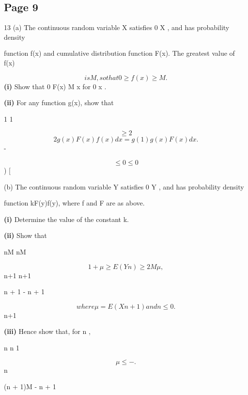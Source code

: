 \documentclass[12pt]{article}
\begin{document}
\subsection*{Page 9}
\begin{flushleft}
13 (a) The continuous random variable X satisfies 0 \geq X , and has probability density\par
function f(x) and cumulative distribution function F(x). The greatest value of f(x)\par
\[is M , so that 0 \geq f(x) \geq M .\]
\textbf{(i)} Show that 0 \geq F(x) \geq M x for 0 \geq x .\par
\textbf{(ii)} For any function g(x), show that\par
1 1\par
\[\geq 2\]
\[2g(x)F(x)f(x)dx = g(1) g (x) F(x) dx .\]
-\par
\[\leq0 \leq0\]
) [\par
(b) The continuous random variable Y satisfies 0 \geq Y , and has probability density\par
function kF(y)f(y), where f and F are as above.\par
\textbf{(i)} Determine the value of the constant k.\par
\textbf{(ii)} Show that\par
nM nM\par
\[1 + μ \geq E(Y n) \geq 2M μ ,\]
n+1 n+1\par
n + 1 - n + 1\par
\[where μ = E(Xn+1) and n \leq 0.\]
n+1\par
\textbf{(iii)} Hence show that, for n ,\par
n n 1\par
\[μ \leq - .\]
n\par
(n + 1)M - n + 1\par
\end{flushleft}
\end{document}
